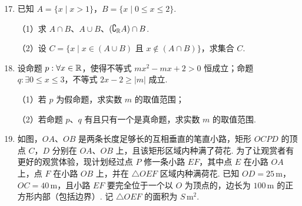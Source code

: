 \documentclass[a4paper,11pt]{article}
\begin{document}
\begin{enumerate}
\setcounter{enumi}{16}

\item 已知 $A=\{x\mid x>1\}$，$B=\{x\mid0\leqslant x\leqslant2\}$.

（1）求 $A\cap B$、$A\cup B$、$(\complement_{\mathbb{R}} A)\cap B$.

（2）设 $C=\{x\mid x\in(A\cup B)\text{ 且 }x\notin(A\cap B)\}$，求集合 $C$.

\ifanswer
\solbegin
{}
\solend
\fi

\ansspace

\item 设命题 $p:\forall x\in\mathbb{R}$，使得不等式 $mx^2-mx+2>0$ 恒成立；命题 $q:\exists0\leqslant x\leqslant3$，不等式 $2x-2\geqslant|m|$ 成立.

（1）若 $p$ 为假命题，求实数 $m$ 的取值范围；

（2）若命题 $p$、$q$ 有且只有一个是真命题，求实数 $m$ 的取值范围.

\ifanswer
\solbegin
{}
\solend
\fi

\ansspace

\item 如图，$OA$、$OB$ 是两条长度足够长的互相垂直的笔直小路，矩形 $OCPD$ 的顶点 $C$，$D$ 分别在 $OA$、$OB$ 上，且该矩形区域内种满了荷花. 为了让观赏者有更好的观赏体验，现计划经过点 $P$ 修一条小路 $EF$，其中点 $E$ 在小路 $OA$ 上，点 $F$ 在小路 $OB$ 上，并在 $\triangle OEF$ 区域内种满荷花. 已知 $OD=25\,\mathrm{m}$，$OC=40\,\mathrm{m}$，且小路 $EF$ 要完全位于一个以 $O$ 为顶点的，边长为 $100\,\mathrm{m}$ 的正方形内部（包括边界）. 记 $\triangle OEF$ 的面积为 $S\,\mathrm{m}^2$.


\end{enumerate}
\end{document}

